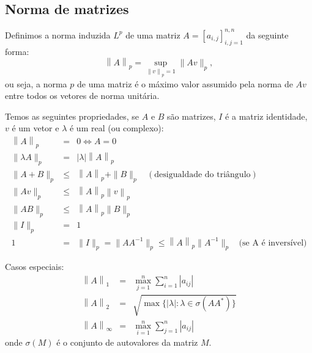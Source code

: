 \subsection{Norma de matrizes}

Definimos a norma induzida $L^p$ de uma matriz $A = [a_{i,j}]_{i,j=1}^{n,n}$ da seguinte forma:
\begin{equation}
  \left\|A\right\|_p = \sup_{\left\|v\right\|_p=1} \|Av\|_p,
\end{equation}
ou seja, a norma $p$ de uma matriz é o máximo valor assumido pela norma de $Av$ entre todos os vetores de norma unitária.

Temos as seguintes propriedades, se $A$ e $B$ são matrizes, $I$ é a matriz identidade, $v$ é um vetor e $\lambda$ é um real (ou complexo):
\begin{eqnarray}
\left\|A\right\|_p&=&0 \Longleftrightarrow A=0\\
\|\lambda A\|_p&=&|\lambda| \left\|A\right\|_p\\
\|A+B\|_p &\leq & \left\|A\right\|_p + \|B\|_p~~~~ (\text{desigualdade do triângulo})\\
\|Av\|_p &\leq& \left\|A\right\|_p\left\|v\right\|_p\\
\|AB\|_p &\leq& \left\|A\right\|_p\|B\|_p\\
\|I\|_p&=&1\\
1&=&\|I\|_p=\|AA^{-1}\|_p\leq \left\|A\right\|_p\|A^{-1}\|_p~~~~ \text{(se A é inversível)}
\end{eqnarray}

Casos especiais:
\begin{eqnarray}
\left\|A\right\|_1&=& \max_{j=1}^n\sum_{i=1}^n \left|a_{ij}\right|\\
\left\|A\right\|_2&=& \sqrt{\max\{|\lambda|: \lambda \in \sigma(AA^*)\}}\\
\left\|A\right\|_\infty&=& \max_{i=1}^n\sum_{j=1}^n \left|a_{ij}\right|
\end{eqnarray}
onde $\sigma(M)$ é o conjunto de autovalores da matriz $M$.

